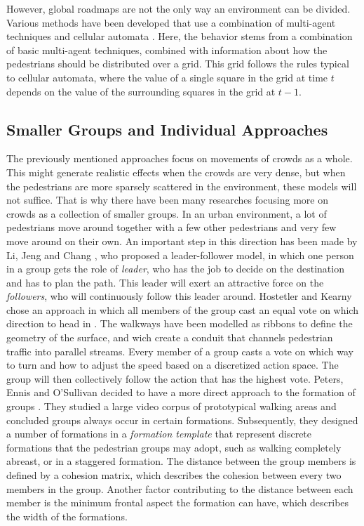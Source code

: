 \documentclass[11pt]{book}
\begin{document}
However, global roadmaps are not the only way an environment can be divided. Various methods have been developed that use a combination of multi-agent techniques and cellular automata \cite{Dijkstra00amulti-agent}\cite{1241047}. Here, the behavior stems from a combination of basic multi-agent techniques, combined with information about how the pedestrians should be distributed over a grid. This grid follows the rules typical to cellular automata, where the value of a single square in the grid at time $t$ depends on the value of the surrounding squares in the grid at $t-1$.


\subsection{Smaller Groups and Individual Approaches}
The previously mentioned approaches focus on movements of crowds as a whole. This might generate realistic effects when the crowds are very dense, but when the pedestrians are more sparsely scattered in the environment, these models will not suffice. That is why there have been many researches focusing more on crowds as a collection of smaller groups. In an urban environment, a lot of pedestrians move around together with a few other pedestrians and very few move around on their own. An important step in this direction has been made by Li, Jeng and Chang \cite{leaderfollower}, who proposed a leader-follower model, in which one person in a group gets the role of \emph{leader}, who has the job to decide on the destination and has to plan the path. This leader will exert an attractive force on the \emph{followers}, who will continuously follow this leader around. Hostetler and Kearny chose an approach in which all members of the group cast an equal vote on which direction to head in \cite{Hostetler02strollingdown}. The walkways have been modelled as ribbons to define the geometry of the surface, and wich create a conduit that channels pedestrian traffic into parallel streams. Every member of a group casts a vote on which way to turn and how to adjust the speed based on a discretized action space. The group will then collectively follow the action that has the highest vote. Peters, Ennis and O'Sullivan decided to have a more direct approach to the formation of groups \cite{10.1109MCG.2009.69}. They studied a large video corpus of prototypical walking areas and concluded groups always occur in certain formations. Subsequently, they designed a number of formations in a \emph{formation template} that represent discrete formations that the pedestrian groups may adopt, such as walking completely abreast, or in a staggered formation. The distance between the group members is defined by a cohesion matrix, which describes the cohesion between every two members in the group. Another factor contributing to the distance between each member is the minimum frontal aspect the formation can have, which describes the width of the formations.\\
\end{document}
